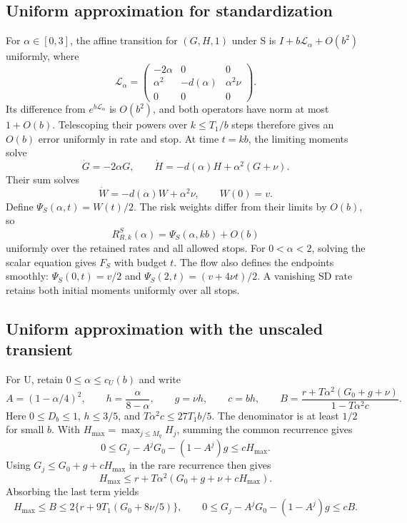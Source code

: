 \documentclass{alt2027}
\begin{document}
\subsection{Uniform approximation for standardization}

For $\alpha \in[0,3]$, the affine transition for $(G,H,1)$ under S is
$I + b\mathcal L_\alpha + O(b^2)$ uniformly, where
\[
  \mathcal L_\alpha = \begin{pmatrix}
                        -2\alpha & 0          & 0           \\
                        \alpha^2 & -d(\alpha) & \alpha^2\nu \\
                        0        & 0          & 0
                      \end{pmatrix}.
\]
Its difference from $e^{b\mathcal L_\alpha}$ is $O(b^2)$, and both operators
have norm at most $1 + O(b)$. Telescoping their powers over $k \leq T_1/b$ steps
therefore gives an $O(b)$ error uniformly in rate and stop. At time $t = kb$,
the limiting moments solve
\[
  \dot G = -2\alpha G,\qquad \dot H = -d(\alpha)H + \alpha^2(G + \nu).
\]
Their sum solves
\[
  \dot W = -d(\alpha)W + \alpha^2\nu,\qquad W(0) = v.
\]
Define $\Psi_S(\alpha,t) = W(t)/2$. The risk weights differ from their limits by
$O(b)$, so
\begin{equation}
  R^S_{R,k}(\alpha) = \Psi_S(\alpha,kb) + O(b) \label{eq:limit-s-uniform}
\end{equation}
uniformly over the retained rates and all allowed stops. For $0 < \alpha < 2$,
solving the scalar equation gives $F_S$ with budget $t$. The flow also defines
the endpoints smoothly: $\Psi_S(0,t) = v/2$ and $\Psi_S(2,t) = (v + 4\nu t)/2$.
A vanishing SD rate retains both initial moments uniformly over all stops.

\subsection{Uniform approximation with the unscaled transient}

For U, retain $0 \leq \alpha \leq c_U(b)$ and write
\[
  A = (1 - \alpha/4)^2,\qquad h
    = \frac{\alpha}{8 - \alpha},\qquad g
    = \nu h,\qquad c
    = bh, \qquad B
    = \frac{r + T\alpha^2(G_0 + g + \nu)}{1 - T\alpha^2c}.
\]
Here $0 \leq D_b \leq 1$, $h \leq 3/5$, and $T\alpha^2c \leq 27T_1b/5$. The
denominator is at least $1/2$ for small $b$. With
$H_{\max} = \max_{j \leq M_q}H_j$, summing the common recurrence gives
\[
  0 \leq G_j - A^jG_0 - (1 - A^j)g \leq cH_{\max}.
\]
Using $G_j \leq G_0 + g + cH_{\max}$ in the rare recurrence then gives
\[
  H_{\max} \leq r + T\alpha^2(G_0 + g + \nu + cH_{\max}).
\]
Absorbing the last term yields
\[
  H_{\max} \leq B
           \leq 2\{r + 9T_1(G_0 + 8\nu/5)\},\qquad 0
           \leq G_j - A^jG_0 - (1 - A^j)g
           \leq cB.
\]
\end{document}
